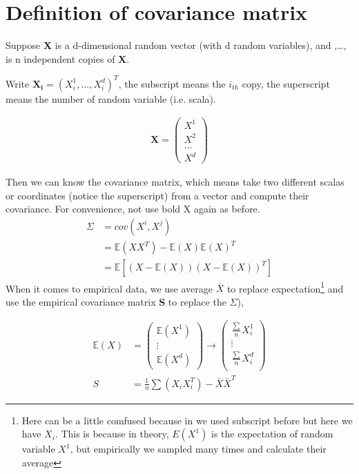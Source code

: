 \documentclass[11pt]{article}
\date{\today}
\begin{document}

\section{Definition of covariance matrix}
\indent

Suppose \textbf{X} is a d-dimensional random vector (with d random variables), and ,\dots, is n independent copies of \textbf{X}.

Write $\bm{X_i} = (X_i^1,\dots,X_i^d)^T$, the subscript means the $i_{th}$ copy, the superscript means the number of random variable (i.e. scala). %

\begin{align}
  \bm{X} =
  \begin{pmatrix}
    X^1\\
    X^2\\
    \dots \\
    X^d
  \end{pmatrix}
\end{align}

Then we can know the covariance matrix, which means take two different scalas or coordinates (notice the superscript) from a vector and compute their covariance. For convenience, not use bold X again as before.
\begin{align}
  \Sigma & = cov(X^i,X^j)\\
         & = \mathbb{E}(XX^T)-\mathbb{E}(X)\mathbb{E}(X)^T\\
         & = \mathbb{E}[(X-\mathbb{E}(X))(X-\mathbb{E}(X))^T]
\end{align}
When it comes to empirical data, we use average $\bar{X}$ to replace expectation\footnote{Here can be a little comfused because in we used subscript before but here we have $X_i$. This is because in theory, $E(X^1)$ is the expectation of random variable $X^1$, but empirically we sampled many times and calculate their average} and use the empirical covariance matrix \textbf{S} to replace the $\Sigma$), 

\begin{align}
  \mathbb{E}(X) & =
  \begin{pmatrix}
    \mathbb{E}(X^1)\\
    \vdots\\
    \mathbb{E}(X^d)
  \end{pmatrix}
  \rightarrow
  \begin{pmatrix}
    \frac{\sum}{n} X_i^1\\
    \vdots\\
    \frac{\sum}{n} X_i^d\\
  \end{pmatrix}\\  
  S &= \frac{1}{n}\sum (X_iX_i^T) - \bar{X}\bar{X}^T \label{eq6}
\end{align}
\end{document}
